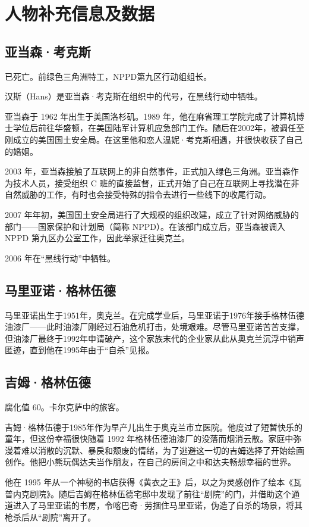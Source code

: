 \chapter{人物补充信息及数据}

\section{亚当森·考克斯}

已死亡。前绿色三角洲特工，NPPD第九区行动组组长。

汉斯（Hans）是亚当森·考克斯在组织中的代号，在黑线行动中牺牲。

亚当森于 1962 年出生于美国洛杉矶。1989 年，他在麻省理工学院完成了计算机博士学位后前往华盛顿，在美国陆军计算机应急部门工作。随后在2002年，被调任至刚成立的美国国土安全局。在这里他和恋人温妮·考克斯相遇，并很快收获了自己的婚姻。

2003 年，亚当森接触了互联网上的非自然事件，正式加入绿色三角洲。亚当森作为技术人员，接受组织 C 班的直接监督，正式开始了自己在互联网上寻找潜在非自然威胁的工作，有时也会接受特殊的指令去进行一些线下的收尾行动。

2007 年年初，美国国土安全局进行了大规模的组织改建，成立了针对网络威胁的部门——国家保护和计划局（简称 NPPD）。在该部门成立后，亚当森被调入 NPPD 第九区办公室工作，因此举家迁往奥克兰。

2006 年在“黑线行动”中牺牲。

\section{马里亚诺·格林伍德}

马里亚诺出生于1951年，奥克兰。在完成学业后，马里亚诺于1976年接手格林伍德油漆厂——此时油漆厂刚经过石油危机打击，处境艰难。尽管马里亚诺苦苦支撑，但油漆厂最终于1992年申请破产，这个家族末代的企业家从此从奥克兰沉浮中销声匿迹，直到他在1995年由于“自杀”见报。

\section{吉姆·格林伍德}

腐化值 60。卡尔克萨中的旅客。

吉姆·格林伍德于1985年作为早产儿出生于奥克兰市立医院。他度过了短暂快乐的童年，但这份幸福很快随着 1992 年格林伍德油漆厂的没落而烟消云散。家庭中弥漫着难以消散的沉默、暴戾和颓废的情绪，为了逃避这一切的吉姆选择了开始绘画创作。他把小熊玩偶达夫当作朋友，在自己的房间之中和达夫畅想幸福的世界。

他在 1995 年从一个神秘的书店获得《黄衣之王》后，以之为灵感创作了绘本《瓦普内克剧院》。随后吉姆在格林伍德宅邸中发现了前往“剧院”的门，并借助这个通道进入了马里亚诺的书房，令喀巴奇·劳捆住马里亚诺，伪造了自杀的场景，将其枪杀后从“剧院”离开了。


